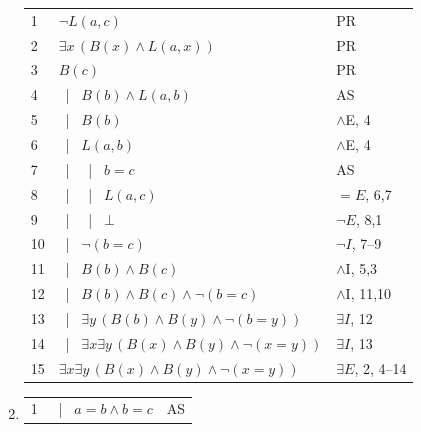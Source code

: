 \documentclass{article}
\newcommand{\asbar}{\ | \ }
\begin{document}
\begin{enumerate}
          \begin{tabular}{l|p{8cm}l}
              \hline
              1  & $\neg L(a,c)$                                                & PR                    \\
              2  & $\exists x\,(B(x)\land L(a,x))$                              & PR                    \\
              3  & $B(c)$                                                       & PR                    \\
              4  & \asbar $B(b)\land L(a,b)$                                    & AS                    \\
              5  & \asbar $B(b)$                                                & $\land$E, 4           \\
              6  & \asbar $L(a,b)$                                              & $\land$E, 4           \\
              7  & \asbar \asbar $b=c$                                          & AS                    \\
              8  & \asbar \asbar $L(a,c)$                                       & $=E$, 6,7             \\
              9  & \asbar \asbar $\bot$                                         & $\neg E$, 8,1         \\
              10 & \asbar $\neg(b=c)$                                           & $\neg I$, 7--9        \\
              11 & \asbar $B(b)\land B(c)$                                      & $\land$I, 5,3         \\
              12 & \asbar $B(b)\land B(c)\land \neg(b=c)$                       & $\land$I, 11,10       \\
              13 & \asbar $\exists y\,(B(b)\land B(y)\land \neg(b=y))$          & $\exists I$, 12       \\
              14 & \asbar $\exists x\exists y\,(B(x)\land B(y)\land \neg(x=y))$ & $\exists I$, 13       \\
              15 & $\exists x\exists y\,(B(x)\land B(y)\land \neg(x=y))$        & $\exists E$, 2, 4--14 \\
              \hline
          \end{tabular}
    \item \begin{tabular}{l|p{8cm}l}
              \hline
              1 & \asbar $a=b\land b=c$                                        & AS             \\

\end{tabular}
\end{enumerate}
\end{document}
